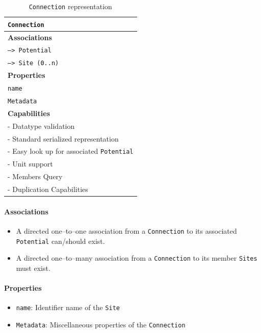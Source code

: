 \documentclass[12pt]{article}
\begin{document}
\begin{table}[ht]
    \centering
     \caption{\texttt{Connection} representation}
    \begin{tabular}{|l|}
         \hline
         \rowcolor{gray!50}
         \texttt{Connection}  \\
         \hline
         \textbf{Associations} \\
         \hline
         \texttt{--> Potential}\\
         \texttt{--> Site (0..n)}\\
         \textbf{Properties}\\
         \hline
         \texttt{name} \\
         \texttt{Metadata}\\
         \hline
         \textbf{Capabilities}\\
         \hline
         - Datatype validation \\
         - Standard serialized representation \\
         - Easy look up for associated \texttt{Potential} \\
         - Unit support \\
         - Members Query \\
         - Duplication Capabilities \\
        \hline
    \end{tabular}
    \label{tab:ConnSpec}
\end{table}

\paragraph{Associations}
\begin{itemize}
    \item A directed one–to–one association from a \texttt{Connection} to its associated \texttt{Potential} can/should exist.
    \item A directed one--to--many association from a \texttt{Connection} to its member \texttt{Sites} must exist.
\end{itemize}
\paragraph{Properties}
\begin{itemize}
    \item \texttt{name}: Identifier name of the \texttt{Site}
    \item \texttt{Metadata}: Miscellaneous properties of the \texttt{Connection}
\end{itemize}
\end{document}
